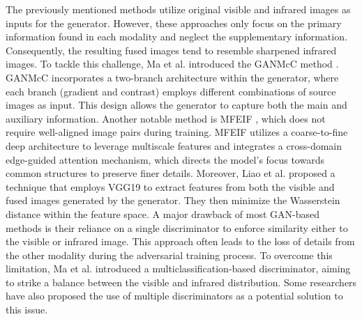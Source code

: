 The previously mentioned methods utilize original visible and infrared images as inputs for the generator. However, these approaches only focus on the primary information found in each modality and neglect the supplementary information. Consequently, the resulting fused images tend to resemble sharpened infrared images. To tackle this challenge, Ma et al. introduced the GANMcC method \cite{ma2020ganmcc}. GANMcC incorporates a two-branch architecture within the generator, where each branch (gradient and contrast) employs different combinations of source images as input. This design allows the generator to capture both the main and auxiliary information. Another notable method is MFEIF \cite{liu2021learning}, which does not require well-aligned image pairs during training. MFEIF utilizes a coarse-to-fine deep architecture to leverage multiscale features and integrates a cross-domain edge-guided attention mechanism, which directs the model's focus towards common structures to preserve finer details. Moreover, Liao et al. proposed a technique \cite{liao2020fusion} that employs VGG19 to extract features from both the visible and fused images generated by the generator. They then minimize the Wasserstein distance within the feature space. A major drawback of most GAN-based methods is their reliance on a single discriminator to enforce similarity either to the visible or infrared image. This approach often leads to the loss of details from the other modality during the adversarial training process. To overcome this limitation, Ma et al. \cite{ma2020ganmcc} introduced a multiclassification-based discriminator, aiming to strike a balance between the visible and infrared distribution. Some researchers have also proposed the use of multiple discriminators as a potential solution to this issue.